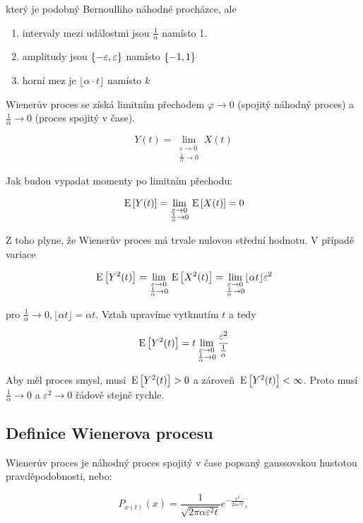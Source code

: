 který je podobný Bernoulliho náhodné procházce, ale

\begin{enumerate}[label=\roman*)]
\item intervaly mezi událostmi jsou $\frac{1}{\alpha}$ namísto 1.
\item amplitudy jsou $\left\{-\varepsilon,\varepsilon\right\}$ namísto $\left\{-1,1\right\}$
\item horní mez je $\lfloor\alpha\cdot t\rfloor$ namísto $k$
\end{enumerate}

Wienerův proces se získá limitním přechodem $\varphi\to 0$ (spojitý náhodný proces) a $\frac{1}{\alpha}\to 0$ (proces spojitý v čase).

\[ Y(t) = \lim_{\substack{\varepsilon\to 0\\ \frac{1}{\alpha}\to 0}} X(t) \]

Jak budou vypadat momenty po limitním přechodu:

\[ \,\mathrm{E}\left[Y(t)\right] = \lim_{\substack{\varepsilon\to 0\\ \frac{1}{\alpha}\to 0}} \,\mathrm{E}\left[X(t)\right]=0 \]

Z toho plyne, že Wienerův proces má trvale nulovou střední hodnotu. V případě variace

\[ \,\mathrm{E}\left[Y^2(t)\right] = \lim_{\substack{\varepsilon\to 0\\ \frac{1}{\alpha}\to 0}} \,\mathrm{E}\left[X^2(t)\right]=\lim_{\substack{\varepsilon\to 0\\ \frac{1}{\alpha}\to 0}} \lfloor\alpha t\rfloor \varepsilon^2 \]

pro $\frac{1}{\alpha}\to 0, \lfloor\alpha t\rfloor=\alpha t$. Vztah upravíme vytknutím $t$ a tedy

\[ \,\mathrm{E}\left[Y^2(t)\right] = t \lim_{\substack{\varepsilon\to 0\\ \frac{1}{\alpha}\to 0}} \frac{\varepsilon^2}{\frac{1}{\alpha}} \]

Aby měl proces smysl, musí $\,\mathrm{E}\left[Y^2(t)\right]>0$ a zároveň $\,\mathrm{E}\left[Y^2(t)\right]<\infty$. Proto musí $\frac{1}{\alpha}\to 0$ a $\varepsilon^2\to 0$ řádově stejně rychle.

\subsection{Definice Wienerova procesu}
Wienerův proces je náhodný proces spojitý v čase popsaný gaussovskou hustotou pravděpodobnosti, nebo:

\[ P_{x(t)}(x)=\frac{1}{\sqrt{2\pi\alpha\varepsilon^2 t}}e^{-\frac{x^2}{2\alpha\varepsilon^2 t}}, \]

